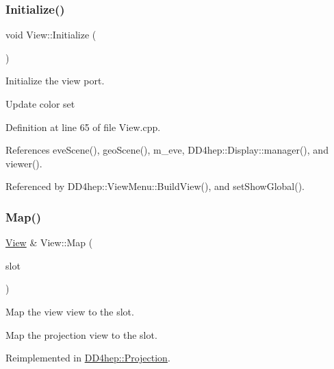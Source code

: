 \hypertarget{class_d_d4hep_1_1_view_a7a968707a03a2fb140df5f4264708a20}{}\label{class_d_d4hep_1_1_view_a7a968707a03a2fb140df5f4264708a20} 
\subsubsection{\texorpdfstring{Initialize()}{Initialize()}}
{\footnotesize\ttfamily void View\+::\+Initialize (\begin{DoxyParamCaption}{ }\end{DoxyParamCaption})\hspace{0.3cm}{\ttfamily [virtual]}}



Initialize the view port. 

Update color set 

Definition at line 65 of file View.\+cpp.



References eve\+Scene(), geo\+Scene(), m\+\_\+eve, D\+D4hep\+::\+Display\+::manager(), and viewer().



Referenced by D\+D4hep\+::\+View\+Menu\+::\+Build\+View(), and set\+Show\+Global().

\hypertarget{class_d_d4hep_1_1_view_a570467ad2be3126bca9aa3563338bcd2}{}\label{class_d_d4hep_1_1_view_a570467ad2be3126bca9aa3563338bcd2} 
\subsubsection{\texorpdfstring{Map()}{Map()}}
{\footnotesize\ttfamily \hyperlink{class_d_d4hep_1_1_view}{View} \& View\+::\+Map (\begin{DoxyParamCaption}\item[{T\+Eve\+Window $\ast$}]{slot }\end{DoxyParamCaption})\hspace{0.3cm}{\ttfamily [virtual]}}



Map the view view to the slot. 

Map the projection view to the slot. 

Reimplemented in \hyperlink{class_d_d4hep_1_1_projection_a68380e96afb21b0c4fd52e986032df80}{D\+D4hep\+::\+Projection}.



